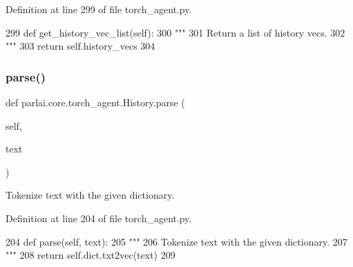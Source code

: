 Definition at line 299 of file torch\+\_\+agent.\+py.


\begin{DoxyCode}
299     \textcolor{keyword}{def }get\_history\_vec\_list(self):
300         \textcolor{stringliteral}{"""}
301 \textcolor{stringliteral}{        Return a list of history vecs.}
302 \textcolor{stringliteral}{        """}
303         \textcolor{keywordflow}{return} self.history\_vecs
304 
\end{DoxyCode}
\mbox{\label{classparlai_1_1core_1_1torch__agent_1_1History_a7758c7e9d42442ac228b820be4298d84}} 
\subsubsection{\texorpdfstring{parse()}{parse()}}
{\footnotesize\ttfamily def parlai.\+core.\+torch\+\_\+agent.\+History.\+parse (\begin{DoxyParamCaption}\item[{}]{self,  }\item[{}]{text }\end{DoxyParamCaption})}

\begin{DoxyVerb}Tokenize text with the given dictionary.
\end{DoxyVerb}
 

Definition at line 204 of file torch\+\_\+agent.\+py.


\begin{DoxyCode}
204     \textcolor{keyword}{def }parse(self, text):
205         \textcolor{stringliteral}{"""}
206 \textcolor{stringliteral}{        Tokenize text with the given dictionary.}
207 \textcolor{stringliteral}{        """}
208         \textcolor{keywordflow}{return} self.dict.txt2vec(text)
209 
\end{DoxyCode}
\mbox{\label{classparlai_1_1core_1_1torch__agent_1_1History_a82e02d0b34707b2e00b95bc659411bae}} 

